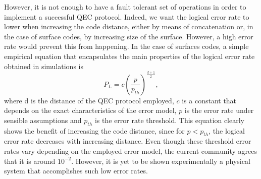 However, it is not enough to have a fault tolerant set of operations in order to
implement a successful QEC protocol. Indeed, we want the logical error rate to
lower when increasing the code distance, either by means of concatenation or, in
the case of surface codes, by increasing size of the surface. However, a high
error rate would prevent this from happening. In the case of surfaces codes, a
simple empirical equation that encapsulates the main properties of the logical
error rate obtained in simulations is
\cite{fowler12_surfac_codes}
\begin{equation}
  \label{eq:1}
  P_L = c\left(\frac{p}{p_{th}}\right)^{\frac{ d+1 }{2}},
\end{equation}
where d is the distance of the QEC protocol employed, $c$ is a constant that
depends on the exact characteristics of the error model, $p$ is the error rate
under sensible assumptions and $p_{th}$ is the error rate threshold. This
equation clearly shows the benefit of increasing the code distance, since for
$p<p_{th}$, the logical error rate decreases with increasing distance. Even
though these threshold error rates vary depending on the employed error model,
the current community agrees that it is around $10^{-2}$. However, it is yet to
be shown experimentally a physical system that accomplishes such low error
rates.



